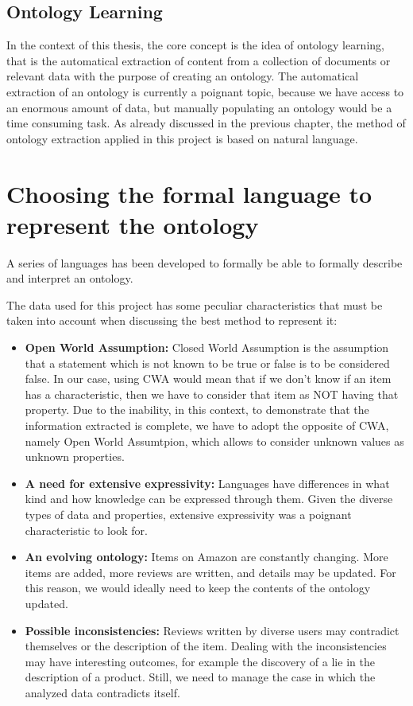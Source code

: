 \documentclass[LaM,binding=0.6cm]{sapthesis}
\begin{document}
\subsection{Ontology Learning}
In the context of this thesis, the core concept is the idea of ontology learning, that is the automatical extraction of content from a collection of documents or relevant data with the purpose of creating an ontology. 
The automatical extraction of an ontology is currently a poignant topic, because we have access to an enormous amount of data, but manually populating an ontology would be a time consuming task. 
As already discussed in the previous chapter, the method of ontology extraction applied in this project is based on natural language.

\section{Choosing the formal language to represent the ontology}
A series of languages has been developed to formally be able to formally describe and interpret an ontology.

The data used for this project has some peculiar characteristics that must be taken into account when discussing the best method to represent it:
\begin{itemize}
	\item \textbf{Open World Assumption: } Closed World Assumption is the assumption that a statement which is not known to be true or false is to be considered false. In our case, using CWA would mean that if we don't know if an item has a characteristic, then we have to consider that item as NOT having that property. Due to the inability, in this context, to demonstrate that the information extracted is complete, we have to adopt the opposite of CWA, namely Open World Assumtpion, which allows to consider unknown values as unknown properties.

	\item \textbf{A need for extensive expressivity: } Languages have differences in what kind and how knowledge can be expressed through them. Given the diverse types of data and properties, extensive expressivity was a poignant characteristic to look for.

	\item \textbf{An evolving ontology: } Items on Amazon are constantly changing. More items are added, more reviews are written, and details may be updated. For this reason, we would ideally need to keep the contents of the ontology updated.

	\item \textbf{Possible inconsistencies: } Reviews written by diverse users may contradict themselves or the description of the item. Dealing with the inconsistencies may have interesting outcomes, for example the discovery of a lie in the description of a product. Still, we need to manage the case in which the analyzed data contradicts itself.
\end{itemize}
\end{document}
